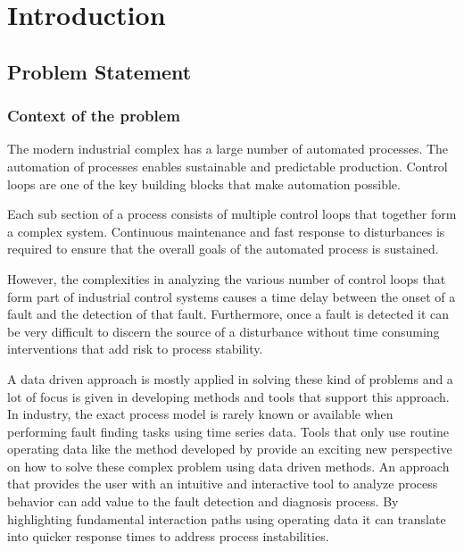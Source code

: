 
\chapter{Introduction}

\section{Problem Statement}

\subsection{Context of the problem}

The modern industrial complex has a large number of automated processes. The automation of processes enables sustainable and predictable production. Control loops are one of the key building blocks that make automation possible.\par
Each sub section of a process consists of multiple control loops that together form a complex system. Continuous maintenance and fast response to disturbances is required to ensure that the overall goals of the automated process is sustained.\par
However, the complexities in analyzing the various number of control loops that form part of industrial control systems causes a time delay between the onset of a fault and the detection of that fault. Furthermore, once a fault is detected it can be very difficult to discern the source of a disturbance without time consuming interventions that add risk to process stability.\cite{thornhill2007advances}\par
A data driven approach is mostly applied in solving these kind of problems and a lot of focus is given in developing methods and tools that support this approach. 
In industry, the exact process model is rarely known or available when performing fault finding tasks using time series data.\cite{rahman2010new} Tools that only use routine operating data like the method developed by \cite{farenzena2009looprank} provide an exciting new perspective on how to solve these complex problem using data driven methods. An approach that provides the user with an intuitive and interactive tool to analyze process behavior can add value to the fault detection and diagnosis process. By highlighting fundamental interaction paths using operating data it can translate into quicker response times to address process instabilities.\par

